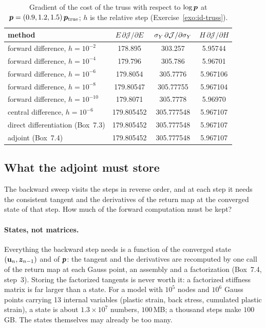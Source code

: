 \begin{table}[h]
\centering\small
\renewcommand{\arraystretch}{1.15}
\begin{tabular}{@{}lccc@{}}
\toprule
\sffamily method & $E\,\partial\mathcal J/\partial E$ & $\sigma_{Y}\,\partial\mathcal J/\partial\sigma_{Y}$ & $H\,\partial\mathcal J/\partial H$\\
\midrule
forward difference, $h=10^{-2}$ & 178.895 & 303.257 & 5.95744\\
forward difference, $h=10^{-4}$ & 179.796 & 305.786 & 5.96701\\
forward difference, $h=10^{-6}$ & 179.8054 & 305.7776 & 5.967106\\
forward difference, $h=10^{-8}$ & 179.80547 & 305.77755 & 5.967104\\
forward difference, $h=10^{-10}$ & 179.8071 & 305.7778 & 5.96970\\
central difference, $h=10^{-6}$ & 179.805452 & 305.777548 & 5.967107\\
direct differentiation (Box~7.3) & 179.805452 & 305.777548 & 5.967107\\
adjoint (Box~7.4) & 179.805452 & 305.777548 & 5.967107\\
\bottomrule
\end{tabular}
\caption{Gradient of the cost of the truss with respect to $\log\bm{p}$ at
$\bm{p}=(0.9,1.2,1.5)\,\bm{p}_{\mathrm{true}}$; $h$ is the relative step
(Exercise~\ref{exo:id-truss}).}
\label{tab:id-fd}
\end{table}

\subsection{What the adjoint must store}\label{ssec:id-storage}
%
The backward sweep visits the steps in reverse order, and at each step it needs
the consistent tangent and the derivatives of the return map at the converged
state of that step. How much of the forward computation must be kept?

\paragraph{States, not matrices.}
Everything the backward step needs is a function of the converged state
$(\mathbf{u}_n,\bm{z}_{n-1})$ and of $\bm{p}$: the tangent and the derivatives are recomputed
by one call of the return map at each Gauss point, an assembly and a
factorization (Box~7.4, step~3). Storing the factorized tangents is never
worth it: a factorized stiffness matrix is far larger than a state. For a model
with $10^5$ nodes and $10^6$ Gauss points carrying 13 internal variables (plastic
strain, back stress, cumulated plastic strain), a state is about $1.3\times10^7$
numbers, $100$\,MB; a thousand steps make $100$\,GB. The states themselves may
already be too many.

